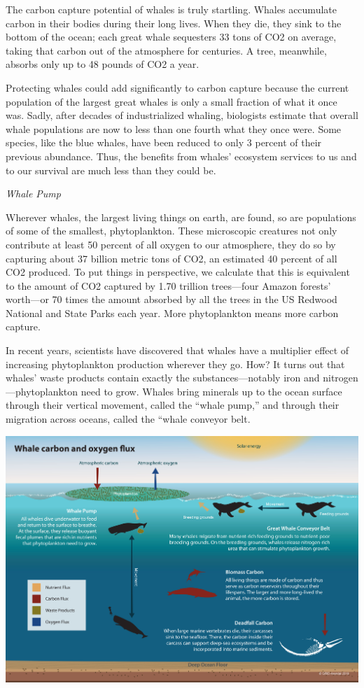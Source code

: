 \documentclass[
]{book}
\begin{document}
The carbon capture potential of whales is truly startling. Whales accumulate carbon in their bodies during their long lives. When they die, they sink to the bottom of the ocean; each great whale sequesters 33 tons of CO2 on average, taking that carbon out of the atmosphere for centuries. A tree, meanwhile, absorbs only up to 48 pounds of CO2 a year.

Protecting whales could add significantly to carbon capture because the current population of the largest great whales is only a small fraction of what it once was. Sadly, after decades of industrialized whaling, biologists estimate that overall whale populations are now to less than one fourth what they once were. Some species, like the blue whales, have been reduced to only 3 percent of their previous abundance. Thus, the benefits from whales' ecosystem services to us and to our survival are much less than they could be.

\emph{Whale Pump}

Wherever whales, the largest living things on earth, are found, so are populations of some of the smallest, phytoplankton. These microscopic creatures not only contribute at least 50 percent of all oxygen to our atmosphere, they do so by capturing about 37 billion metric tons of CO2, an estimated 40 percent of all CO2 produced. To put things in perspective, we calculate that this is equivalent to the amount of CO2 captured by 1.70 trillion trees---four Amazon forests' worth---or 70 times the amount absorbed by all the trees in the US Redwood National and State Parks each year. More phytoplankton means more carbon capture.

In recent years, scientists have discovered that whales have a multiplier effect of increasing phytoplankton production wherever they go. How? It turns out that whales' waste products contain exactly the substances---notably iron and nitrogen---phytoplankton need to grow. Whales bring minerals up to the ocean surface through their vertical movement, called the ``whale pump,'' and through their migration across oceans, called the ``whale conveyor belt.

\includegraphics{fig/whale_flux.jpg}
\end{document}
